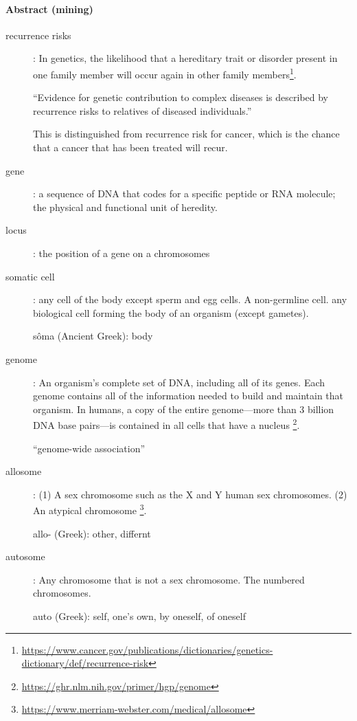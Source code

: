 \paragraph*{Abstract (mining)}
\begin{description}
\item[recurrence risks] :
	In genetics, the likelihood that a hereditary trait or disorder present in one family member will occur again in other family members\footnote{\url{https://www.cancer.gov/publications/dictionaries/genetics-dictionary/def/recurrence-risk}}.

	``Evidence for genetic contribution to complex diseases is described by recurrence risks to relatives of diseased individuals.''

	This is distinguished from recurrence risk for cancer, which is the chance that a cancer that has been treated will recur.

\item[gene] :
	a sequence of DNA that codes for a specific peptide or RNA molecule; the physical and functional unit of heredity.

\item[locus] :
	the position of a gene on a chromosomes

\item[somatic cell] :
	any cell of the body except sperm and egg cells. A non-germline cell. any biological cell forming the body of an organism (except gametes).

	sôma (Ancient Greek): body

\item[genome] :
	An organism’s complete set of DNA, including all of its genes. Each genome contains all of the information needed to build and maintain that organism. In humans, a copy of the entire genome—more than 3 billion DNA base pairs—is contained in all cells that have a nucleus \footnote{\url{https://ghr.nlm.nih.gov/primer/hgp/genome}}.

	``genome-wide association''

\item[allosome] :
	(1) A sex chromosome such as the X and Y human sex chromosomes. (2) An atypical chromosome \footnote{\url{https://www.merriam-webster.com/medical/allosome}}.

	allo- (Greek): other, differnt

\item[autosome] :
	Any chromosome that is not a sex chromosome. The numbered chromosomes.

	auto (Greek): self, one's own, by oneself, of oneself


\end{description}
